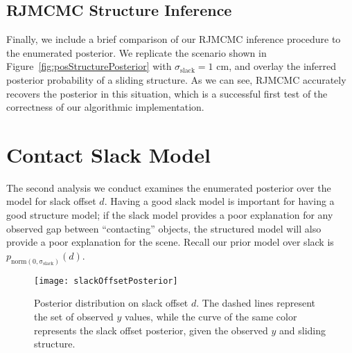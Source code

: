 \subsection{RJMCMC Structure Inference}
Finally, we include a brief comparison of our RJMCMC inference procedure to the enumerated posterior.
We replicate the scenario shown in Figure~\ref{fig:posStructurePosterior} with $\sigma_\mathrm{slack} = 1$ cm, and overlay the inferred posterior probability of a sliding structure.
As we can see, RJMCMC accurately recovers the posterior in this situation, which is a successful first test of the correctness of our algorithmic implementation.

\section{Contact Slack Model}
The second analysis we conduct examines the enumerated posterior over the model for slack offset $d$.
Having a good slack model is important for having a good structure model; if the slack model provides a poor explanation for any observed gap between ``contacting'' objects, the structured model will also provide a poor explanation for the scene.
Recall our prior model over slack is $p_\mathrm{norm(0,\sigma_\mathrm{slack})}(d)$.

\begin{figure}[h]
  \centering
  \texttt{[image: slackOffsetPosterior]}
  \caption{
    Posterior distribution on slack offset $d$.
    The dashed lines represent the set of observed $y$ values, while the curve of the same color represents the slack offset posterior, given the observed $y$ and sliding structure.
  }
  \label{fig:slackOffsetPosterior}
\end{figure}

